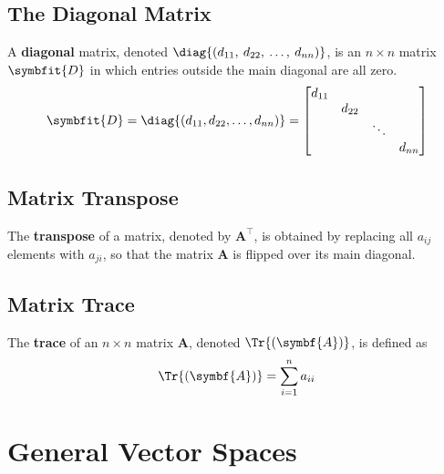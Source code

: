 \documentclass{article}
\begin{document}
\subsection{The Diagonal Matrix}
\begin{definition}
    A \textbf{diagonal} matrix, denoted
    \(\diag{\left( d_{11},\: d_{22},\: \ldots,\: d_{nn} \right)}\), is
    an \(n \times n\) matrix \(\symbfit{D}\) in which entries outside
    the main diagonal are all zero.
    \begin{equation*}
        \symbfit{D} = \diag{\left( d_{11}, d_{22}, \ldots, d_{nn} \right)} =
        \begin{bmatrix}
            d_{11} &        &        &        \\
                   & d_{22} &        &        \\
                   &        & \ddots &        \\
                   &        &        & d_{nn}
        \end{bmatrix}
    \end{equation*}
\end{definition}
\subsection{Matrix Transpose}
\begin{definition}
    The \textbf{transpose} of a matrix, denoted by \(\symbf{A}^\top\),
    is obtained by replacing all \(a_{ij}\) elements with \(a_{ji}\), so
    that the matrix \(\symbf{A}\) is flipped over its main diagonal.
\end{definition}
\subsection{Matrix Trace}
\begin{definition}
    The \textbf{trace} of an \(n \times n\) matrix \(\symbf{A}\),
    denoted \(\Tr{\left( \symbf{A} \right)}\), is defined as
    \begin{equation*}
        \Tr{\left( \symbf{A} \right)} = \sum_{i=1}^n a_{ii}
    \end{equation*}
\end{definition}
\newpage
\section{General Vector Spaces}
\end{document}
